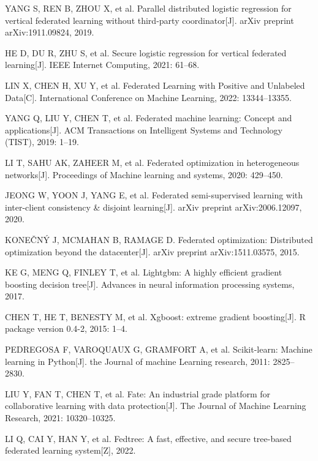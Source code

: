\begin{thebibliography}{200}
	YANG S, REN B, ZHOU X, et al. Parallel distributed logistic regression for vertical federated learning without third-party coordinator[J]. arXiv preprint arXiv:1911.09824, 2019.
	
	HE D, DU R, ZHU S, et al. Secure logistic regression for vertical federated learning[J]. IEEE Internet Computing, 2021: 61--68.
	
	LIN X, CHEN H, XU Y, et al. Federated Learning with Positive and Unlabeled Data[C]. International Conference on Machine Learning, 2022: 13344--13355.
	
	YANG Q, LIU Y, CHEN T, et al. Federated machine learning: Concept and applications[J]. ACM Transactions on Intelligent Systems and Technology (TIST), 2019: 1--19.
	
	LI T, SAHU AK, ZAHEER M, et al. Federated optimization in heterogeneous networks[J]. Proceedings of Machine learning and systems, 2020: 429--450.
	
	JEONG W, YOON J, YANG E, et al. Federated semi-supervised learning with inter-client consistency \& disjoint learning[J]. arXiv preprint arXiv:2006.12097, 2020.
	
	KONEČNÝ J, MCMAHAN B, RAMAGE D. Federated optimization: Distributed optimization beyond the datacenter[J]. arXiv preprint arXiv:1511.03575, 2015.
	
	
	
	KE G, MENG Q, FINLEY T, et al. Lightgbm: A highly efficient gradient boosting decision tree[J]. Advances in neural information processing systems, 2017.
	
	CHEN T, HE T, BENESTY M, et al. Xgboost: extreme gradient boosting[J]. R package version 0.4-2, 2015: 1--4.
	
	PEDREGOSA F, VAROQUAUX G, GRAMFORT A, et al. Scikit-learn: Machine learning in Python[J]. the Journal of machine Learning research, 2011: 2825--2830.
	
	LIU Y, FAN T, CHEN T, et al. Fate: An industrial grade platform for collaborative learning with data protection[J]. The Journal of Machine Learning Research, 2021: 10320--10325.
	
	LI Q, CAI Y, HAN Y, et al. Fedtree: A fast, effective, and secure tree-based federated learning system[Z], 2022.
	

\end{thebibliography}
